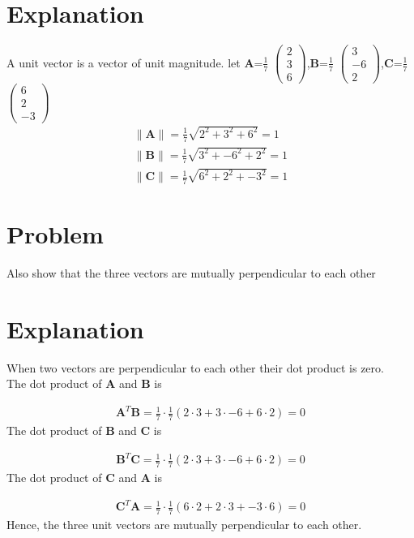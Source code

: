 \documentclass[journal,12pt,twocolumn]{IEEEtran}
\newcommand{\norm}[1]{\| #1 \|}
\begin{document}
\section{Explanation}
A unit vector is a vector of unit magnitude.
\vspace{0.5cm} let $\bm{A}$=\(\frac{1}{7}\) $\begin{pmatrix}2 \\3 \\6\end{pmatrix}$,$\bm{B}$=\(\frac{1}{7}\) $\begin{pmatrix}3 \\-6 \\2\end{pmatrix}$,$\bm{C}$=\(\frac{1}{7}\) $\begin{pmatrix}6 \\2 \\-3\end{pmatrix}$\\
\begin{align*}
    \norm{\bm{A}}=\frac{1}{7}\sqrt{2^2+3^2+6^2}=1\\
    \norm{\bm{B}}=\frac{1}{7}\sqrt{3^2+-6^2+2^2}=1\\
    \norm{\bm{C}}=\frac{1}{7}\sqrt{6^2+2^2+-3^2}=1
\end{align*}
\section{Problem}
Also show that the three vectors are mutually perpendicular to each other
\section{Explanation}
\noindent
When two vectors are perpendicular to each other their dot product is zero.\\
The dot product of $\bm{A}$ and $\bm{B}$ is\par
\begin{align}
    \bm{A}^T\bm{B}=\frac{1}{7}\cdot\frac{1}{7}(2\cdot3+3\cdot-6+6\cdot2)=0
\end{align}
The dot product of $\bm{B}$ and $\bm{C}$ is \par
\begin{align}
    \bm{B}^T\bm{C}=\frac{1}{7}\cdot\frac{1}{7}(2\cdot3+3\cdot-6+6\cdot2)=0
\end{align}
The dot product of $\bm{C}$ and $\bm{A}$ is \par
\begin{align}
    \bm{C}^T\bm{A}=\frac{1}{7}\cdot\frac{1}{7}(6\cdot2+2\cdot3+-3\cdot6)=0
\end{align}
Hence, the three unit vectors are mutually perpendicular to each other.
\end{document}

